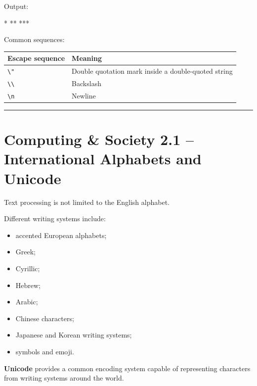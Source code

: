 \documentclass[
]{article}
\newenvironment{Shaded}{\begin{snugshade}}{\end{snugshade}}
\newcommand{\NormalTok}[1]{#1}
\newcounter{none} %
\providecommand{\tightlist}{%
  \setlength{\itemsep}{0pt}\setlength{\parskip}{0pt}}
\begin{document}
Output:

\begin{Shaded}
\begin{Highlighting}[]
\NormalTok{*}
\NormalTok{**}
\NormalTok{***}
\end{Highlighting}
\end{Shaded}

Common sequences:

{\def\LTcaptype{none} %
\begin{longtable}[]{@{}ll@{}}
\toprule\noalign{}
Escape sequence & Meaning \\
\midrule\noalign{}
\endhead
\bottomrule\noalign{}
\endlastfoot
\texttt{\textbackslash{}"} & Double quotation mark inside a
double-quoted string \\
\texttt{\textbackslash{}\textbackslash{}} & Backslash \\
\texttt{\textbackslash{}n} & Newline \\
\end{longtable}
}

\begin{center}\rule{0.5\linewidth}{0.5pt}\end{center}

\section{Computing \& Society 2.1 -- International Alphabets and
Unicode}\label{computing-society-2.1-international-alphabets-and-unicode}

Text processing is not limited to the English alphabet.

Different writing systems include:

\begin{itemize}
\tightlist
\item
  accented European alphabets;
\item
  Greek;
\item
  Cyrillic;
\item
  Hebrew;
\item
  Arabic;
\item
  Chinese characters;
\item
  Japanese and Korean writing systems;
\item
  symbols and emoji.
\end{itemize}

\textbf{Unicode} provides a common encoding system capable of
representing characters from writing systems around the world.
\end{document}

